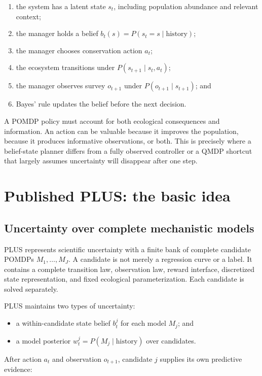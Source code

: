 \documentclass[11pt]{article}
\begin{document}
\begin{enumerate}
  \item the system has a latent state $s_t$, including population abundance and relevant context;
  \item the manager holds a belief $b_t(s)=P(s_t=s\mid\text{history})$;
  \item the manager chooses conservation action $a_t$;
  \item the ecosystem transitions under $P(s_{t+1}\mid s_t,a_t)$;
  \item the manager observes survey $o_{t+1}$ under $P(o_{t+1}\mid s_{t+1})$; and
  \item Bayes' rule updates the belief before the next decision.
\end{enumerate}

A POMDP policy must account for both ecological consequences and information. An action can be
valuable because it improves the population, because it produces informative observations, or both.
This is precisely where a belief-state planner differs from a fully observed controller or a QMDP
shortcut that largely assumes uncertainty will disappear after one step.

\section{Published PLUS: the basic idea}

\subsection{Uncertainty over complete mechanistic models}

PLUS represents scientific uncertainty with a finite bank of complete candidate POMDPs
$M_1,\ldots,M_J$. A candidate is not merely a regression curve or a label. It contains a complete
transition law, observation law, reward interface, discretized state representation, and fixed
ecological parameterization. Each candidate is solved separately.

PLUS maintains two types of uncertainty:

\begin{itemize}
  \item a within-candidate state belief $b_t^j$ for each model $M_j$; and
  \item a model posterior $w_t^j=P(M_j\mid\text{history})$ over candidates.
\end{itemize}

After action $a_t$ and observation $o_{t+1}$, candidate $j$ supplies its own predictive evidence:
\end{document}
